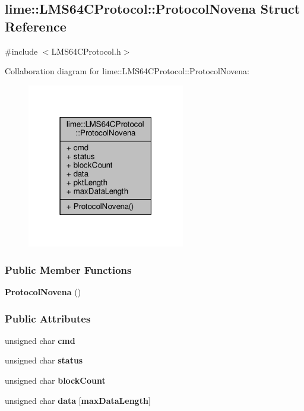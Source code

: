 \subsection{lime\+:\+:L\+M\+S64\+C\+Protocol\+:\+:Protocol\+Novena Struct Reference}
\label{structlime_1_1LMS64CProtocol_1_1ProtocolNovena}


{\ttfamily \#include $<$L\+M\+S64\+C\+Protocol.\+h$>$}



Collaboration diagram for lime\+:\+:L\+M\+S64\+C\+Protocol\+:\+:Protocol\+Novena\+:
\nopagebreak
\begin{figure}[H]
\begin{center}
\leavevmode
\includegraphics[width=195pt]{df/da1/structlime_1_1LMS64CProtocol_1_1ProtocolNovena__coll__graph}
\end{center}
\end{figure}
\subsubsection*{Public Member Functions}
\begin{DoxyCompactItemize}
\item 
{\bf Protocol\+Novena} ()
\end{DoxyCompactItemize}
\subsubsection*{Public Attributes}
\begin{DoxyCompactItemize}
\item 
unsigned char {\bf cmd}
\item 
unsigned char {\bf status}
\item 
unsigned char {\bf block\+Count}
\item 
unsigned char {\bf data} [{\bf max\+Data\+Length}]
\end{DoxyCompactItemize}

